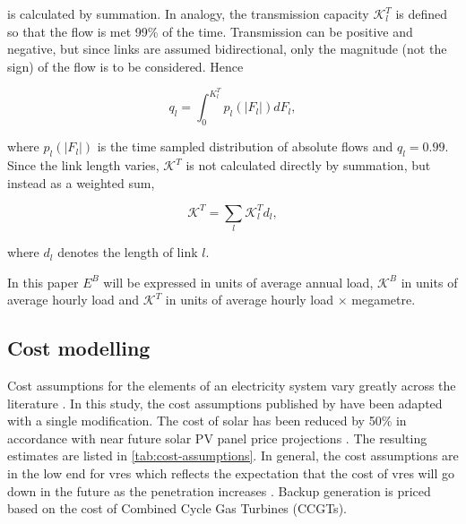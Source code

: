 \documentclass[a4paper, 5p, sort&compress]{elsarticle}%
\begin{document}
is calculated by summation. In analogy, the transmission capacity $\mathcal{K}^{T}_{l}$ is defined
so that the flow is met 99\% of the time. Transmission can be
positive and negative, but since links are assumed bidirectional, only
the magnitude (not the sign) of the flow is to be considered. Hence

\begin{equation}
  \label{eq:link-cap}
  q_{l} = \int _{0} ^{K_{l}^{T}} p_{l}(|F_{l}|)dF_{l},
\end{equation}

where $p_{l}(|F_{l}|)$ is the time sampled distribution of absolute
flows and $q_{l} = 0.99$. Since the link length varies,
$\mathcal{K}^{T}$ is not calculated directly by summation, but instead
as a weighted sum,

\begin{equation}
  \label{eq:4}
  \mathcal{K}^{T} = \sum_{l} \mathcal{K}^{T}_{l} d_{l},
\end{equation}

where $d_{l}$ denotes the length of link $l$.

In this paper $E^{B}$ will be expressed in units of average annual
load, $\mathcal{K}^{B}$ in units of average hourly load and
$\mathcal{K}^{T}$ in units of average hourly load $\times$ megametre.

\subsection{Cost modelling}
\label{sec:cost-modelling}

Cost assumptions for the elements of an electricity system vary
greatly across the literature \cite{Sensitivity}. In this study, the
cost assumptions published by \cite{Rolando} have been adapted with a
single modification. The cost of solar has been reduced by 50\% in
accordance with near future solar PV panel price projections
\cite{irena}. The resulting estimates are listed in
\cref{tab:cost-assumptions}. In general, the cost assumptions are in
the low end for \gls{vres} which reflects the expectation that the cost of
\gls{vres} will go down in the future as the penetration increases
\cite{Fraunhofer}.  Backup generation is priced based on the cost of Combined Cycle Gas Turbines (CCGTs).
\end{document}
